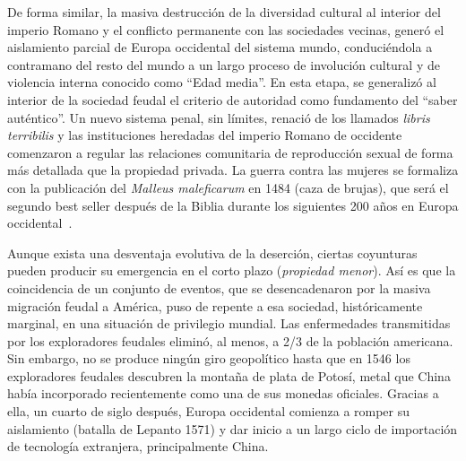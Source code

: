 \documentclass[a4paper,11pt]{book}
\theoremstyle{definition}
\begin{document}
De forma similar, la masiva destrucción de la diversidad cultural al interior del imperio Romano y el conflicto permanente con las sociedades vecinas, generó el aislamiento parcial de Europa occidental del sistema mundo, conduciéndola a contramano del resto del mundo a un largo proceso de involución cultural y de violencia interna conocido como ``Edad media''.
%
%
En esta etapa, se generalizó al interior de la sociedad feudal el criterio de autoridad como fundamento del ``saber auténtico''.
%
Un nuevo sistema penal, sin límites, renació de los llamados \emph{libris terribilis} y las instituciones heredadas del imperio Romano de occidente comenzaron a regular las relaciones comunitaria de reproducción sexual de forma más detallada que la propiedad privada.
%
La guerra contra las mujeres se formaliza con la publicación del \emph{Malleus maleficarum} en 1484 (caza de brujas), que será el segundo best seller después de la Biblia durante los siguientes 200 años en Europa occidental~\cite{zaffaroni2013-cuestionCriminal}.



Aunque exista una desventaja evolutiva de la deserción, ciertas coyunturas pueden producir su emergencia en el corto plazo (\emph{propiedad menor}).
%
Así es que la coincidencia de un conjunto de eventos, que se desencadenaron por la masiva migración feudal a América, puso de repente a esa sociedad, históricamente marginal, en una situación de privilegio mundial.
%
Las enfermedades transmitidas por los exploradores feudales eliminó, al menos, a 2/3 de la población americana.
%
Sin embargo, no se produce ningún giro geopolítico hasta que en 1546 los exploradores feudales descubren la montaña de plata de Potosí, metal que China había incorporado recientemente como una de sus monedas oficiales.
%
Gracias a ella, un cuarto de siglo después, Europa occidental comienza a romper su aislamiento (batalla de Lepanto 1571) y dar inicio a un largo ciclo de importación de tecnología extranjera, principalmente China.

\end{document}
